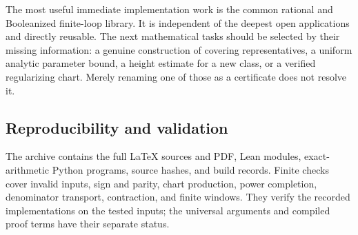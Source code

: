 The most useful immediate implementation work is the common rational and
Booleanized finite-loop library.  It is independent of the deepest open
applications and directly reusable.  The next mathematical tasks should
be selected by their missing information: a genuine construction of
covering representatives, a uniform analytic parameter bound, a height
estimate for a new class, or a verified regularizing chart.  Merely
renaming one of those as a certificate does not resolve it.

\subsection{Reproducibility and validation}

The archive contains the full LaTeX sources and PDF, Lean modules,
exact-arithmetic Python programs, source hashes, and build records.
Finite checks cover invalid inputs, sign and parity, chart production,
power completion, denominator transport, contraction, and finite windows.
They verify the recorded implementations on the tested inputs; the
universal arguments and compiled proof terms have their separate status.
